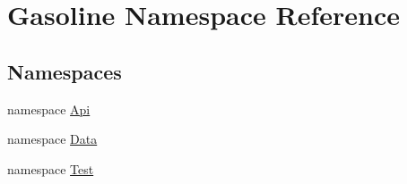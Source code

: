\hypertarget{namespace_gasoline}{}\section{Gasoline Namespace Reference}
\label{namespace_gasoline}
\subsection*{Namespaces}
\begin{DoxyCompactItemize}
\item 
namespace \mbox{\hyperlink{namespace_gasoline_1_1_api}{Api}}
\item 
namespace \mbox{\hyperlink{namespace_gasoline_1_1_data}{Data}}
\item 
namespace \mbox{\hyperlink{namespace_gasoline_1_1_test}{Test}}
\end{DoxyCompactItemize}
